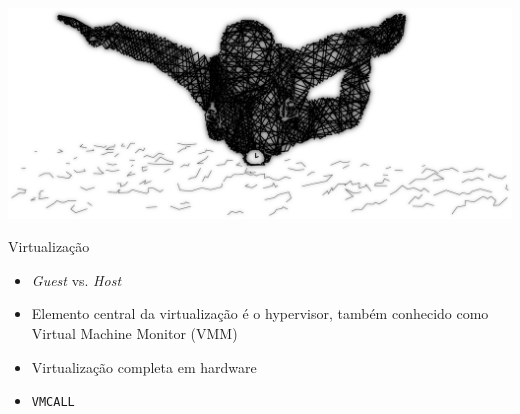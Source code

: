 \documentclass[xcolor={usenames,svgnames,dvipsnames},brazil,english,12pt,aspectratio=149]{beamer}
\begin{document}


%

\begin{frame}[plain]
  \centering
  \includegraphics[width=\textwidth]{presentation_sec_eight}
\end{frame}

\begin{frame}{Virtualização}
    \begin{itemize}
      \item \emph{Guest} vs. \emph{Host}
      \item Elemento central da virtualização é o hypervisor, também conhecido
            como Virtual Machine Monitor (VMM)
      \item Virtualização completa em hardware
      \item \texttt{VMCALL}
    \end{itemize}
\end{frame}
\end{document}
